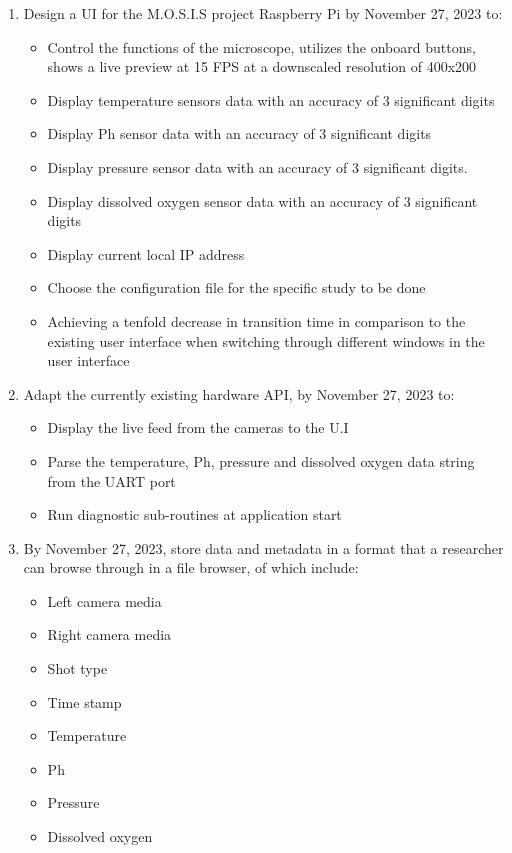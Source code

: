 \begin{enumerate}
	\item Design a UI for the M.O.S.I.S project Raspberry Pi by November 27, 2023 to:
	      \begin{itemize}
		      \item Control the functions of the microscope, utilizes the onboard buttons, shows a live preview at 15 FPS at a downscaled resolution of 400x200
		      \item Display temperature sensors data with an accuracy of 3 significant digits
		      \item Display Ph sensor data with an accuracy of 3 significant digits
		      \item Display pressure sensor data with an accuracy of 3 significant digits.
		      \item Display dissolved oxygen sensor data with an accuracy of 3 significant digits
		      \item Display current local IP address
		      \item Choose the configuration file for the specific study to be done
		      \item Achieving a tenfold decrease in transition time in comparison to the existing user interface when switching through different windows in the user interface
	      \end{itemize}
	\item Adapt the currently existing hardware API, by November 27, 2023 to:
	      \begin{itemize}
		      \item Display the live feed from the cameras to the U.I
		      \item Parse the temperature, Ph, pressure and dissolved oxygen data string from the UART port
		      \item Run diagnostic sub-routines at application start
	      \end{itemize}
	\item By November 27, 2023, store data and metadata in a format that a researcher can browse through in a file browser, of which include:
	      \begin{itemize}
		      \item Left camera media
		      \item Right camera media
		      \item Shot type
		      \item Time stamp
		      \item Temperature
		      \item Ph
		      \item Pressure
		      \item Dissolved oxygen
	      \end{itemize}
\end{enumerate}

